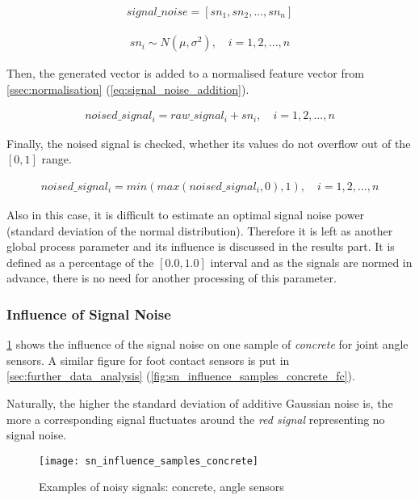 \begin{align}
signal\_noise = [sn_1, sn_2, ..., sn_n]
\end{align}

\begin{align}
sn_i \sim N(\mu, \sigma^2), \quad i = 1, 2, ..., n
\end{align}

Then, the generated vector is added to a normalised feature vector from \cref{ssec:normalisation} (\cref{eq:signal_noise_addition}).

\begin{align} \label{eq:signal_noise_addition}
noised\_signal_i = raw\_signal_i + sn_i, \quad i = 1, 2, ..., n
\end{align}

Finally, the noised signal is checked, whether its values do not overflow out of the $ [0, 1] $ range.

\begin{align}
noised\_signal_i = min(max(noised\_signal_i , 0), 1), \quad i = 1, 2, ..., n
\end{align}

Also in this case, it is difficult to estimate an optimal signal noise power (standard deviation of the normal distribution). Therefore it is left as another global process parameter and its influence is discussed in the results part. It is defined as a percentage of the $ [0.0, 1.0] $ interval and as the signals are normed in advance, there is no need for another processing of this parameter.

\subsubsection*{Influence of Signal Noise} \label{sssec:signal_noise_influence}
\cref{fig:sn_influence_samples_concrete} shows the influence of the signal noise on one sample of \textit{concrete} for joint angle sensors. A similar figure for foot contact sensors is put in \cref{sec:further_data_analysis} (\cref{fig:sn_influence_samples_concrete_fc}).

Naturally, the higher the standard deviation of additive Gaussian noise is, the more a corresponding signal fluctuates around the \textit{red signal} representing no signal noise.

\begin{figure}[H]
  \centering
  \texttt{[image: sn\_influence\_samples\_concrete]}
  \caption{Examples of noisy signals: concrete, angle sensors}
  \label{fig:sn_influence_samples_concrete}
\end{figure}

